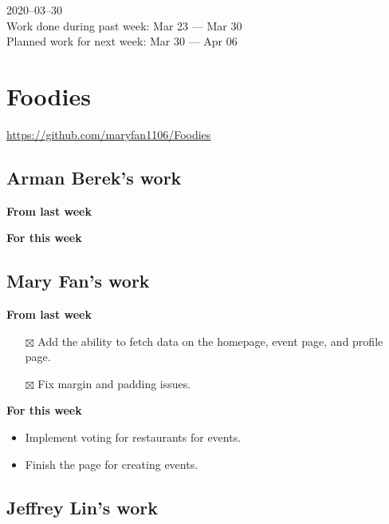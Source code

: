 \documentclass[12pt,letterpaper]{article}
\newcommand{\done}{$\boxtimes$}
\begin{document}
2020--03--30 \\
Work done during past week: Mar 23 --- Mar 30 \\
Planned work for next week: Mar 30 --- Apr 06

\section*{Foodies}
\url{https://github.com/maryfan1106/Foodies}

\subsection*{Arman Berek's work}

\textbf{From last week}


\textbf{For this week}


\subsection*{Mary Fan's work}

\textbf{From last week}
\begin{itemize}
  \item[\done] Add the ability to fetch data on the homepage, event page, and profile page.
  \item[\done] Fix margin and padding issues.
\end{itemize}


\textbf{For this week}
\begin{itemize}
  \item Implement voting for restaurants for events.
  \item Finish the page for creating events.
\end{itemize}


\subsection*{Jeffrey Lin's work}
\end{document}
